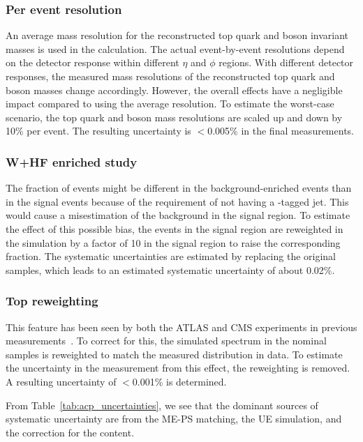 \subsubsection{Per event resolution}
An average mass resolution for the reconstructed top quark and \PW boson invariant masses is used in the \chisq calculation.
The actual event-by-event resolutions depend on the detector response within different $\eta$ and $\phi$ regions.
With different detector responses, the measured mass resolutions of the reconstructed top quark and \PW boson masses change accordingly.
However, the overall effects have a negligible impact compared to using the average resolution.
To estimate the worst-case scenario, the top quark and \PW boson mass resolutions are scaled up and down by 10\% per event.
The resulting uncertainty is $<$0.005\% in the final \Acpprime measurements.

\subsubsection{W+HF enriched study}
The fraction of \WHF events might be different in the background-enriched events than in the signal events because of the requirement of not having a \PQb-tagged jet.
This would cause a misestimation of the background in the signal region.
To estimate the effect of this possible bias, the \WHF events in the signal region are reweighted in the simulation by a factor of 10 in the signal region to raise the corresponding fraction.
The systematic uncertainties are estimated by replacing the original \Wjets samples, which leads to an estimated systematic uncertainty of about 0.02\%.

\subsubsection{Top \PT reweighting}
This feature has been seen by both the ATLAS and CMS experiments in previous measurements~\cite{CMS:2016oae,ATLAS:2019hxz,Kidonakis:2012rm,Czakon:2015owf,Czakon:2017wor,Catani:2019hip}. 
To correct for this, the simulated \PT spectrum in the nominal \ttbar samples is reweighted to match the measured distribution in data.
To estimate the uncertainty in the \Acpprime measurement from this effect, the \PT reweighting is removed.
A resulting uncertainty of $<$0.001\% is determined.

From Table~\ref{tab:acp_uncertainties}, we see that the dominant sources of systematic uncertainty are from the ME-PS matching, the UE simulation, and the correction for the \WHF content.
